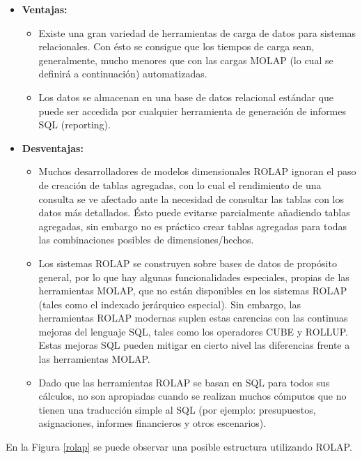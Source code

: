 \documentclass[a4paper,11pt]{article}
\begin{document}
    \begin{itemize}
      \item \textbf{Ventajas:}
        \begin{itemize}
          \item Existe una gran variedad de herramientas de carga de datos para sistemas relacionales. Con ésto se consigue que los tiempos de carga
          sean, generalmente, mucho menores que con las cargas MOLAP (lo cual se definirá a continuación) automatizadas.
          \item Los datos se almacenan en una base de datos relacional estándar que puede ser accedida por cualquier herramienta de generación de
          informes SQL (reporting).
        \end{itemize}
      \item \textbf{Desventajas:}
        \begin{itemize}
          \item Muchos desarrolladores de modelos dimensionales ROLAP ignoran el paso de creación de tablas agregadas, con lo cual el rendimiento de
          una consulta se ve afectado ante la necesidad de consultar las tablas con los datos más detallados. Ésto puede evitarse parcialmente
          añadiendo tablas agregadas, sin embargo no es práctico crear tablas agregadas para todas las combinaciones posibles de dimensiones/hechos.
          \item Los sistemas ROLAP se construyen sobre bases de datos de propósito general, por lo que hay algunas funcionalidades especiales, propias
          de las herramientas MOLAP, que no están disponibles en los sistemas ROLAP (tales como el indexado jerárquico especial). Sin embargo, las
          herramientas ROLAP modernas suplen estas carencias con las continuas mejoras del lenguaje SQL, tales como los operadores CUBE y ROLLUP.
          Estas mejoras SQL pueden mitigar en cierto nivel las diferencias frente a las herramientas MOLAP.
          \item Dado que las herramientas ROLAP se basan en SQL para todos sus cálculos, no son apropiadas cuando se realizan muchos cómputos que
          no tienen una traducción simple al SQL (por ejemplo: presupuestos, asignaciones, informes financieros y otros escenarios).
        \end{itemize}
    \end{itemize}
    
    En la Figura \ref{rolap} se puede observar una posible estructura utilizando ROLAP.
    
\end{document}
